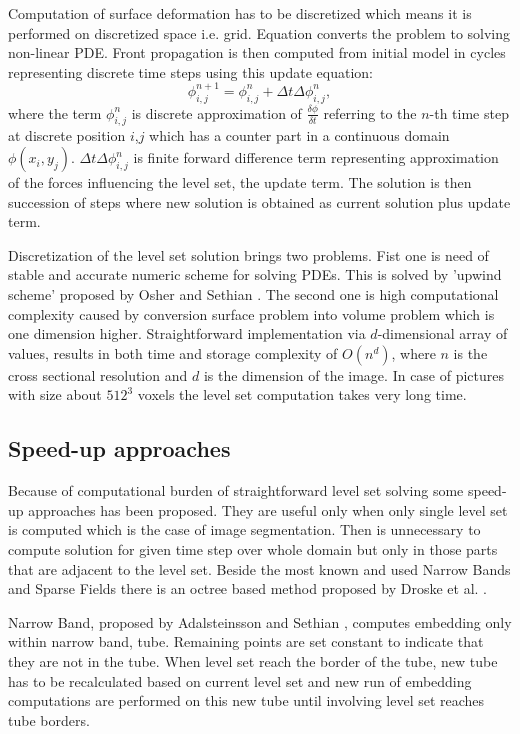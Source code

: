 Computation of surface deformation has to be discretized which means it is performed on discretized space i.e. grid.
Equation converts the problem to solving non-linear PDE.
Front propagation is then computed from initial model in cycles representing discrete time steps using this update equation:
\begin{equation}
\label{deformEqApprox}
\phi_{i,j}^{n+1} = \phi_{i,j}^{n} + \Delta t \Delta \phi_{i,j}^{n},
\end{equation}
where the term $\phi_{i,j}^{n}$ is discrete approximation of $\frac{\delta\phi}{\delta t}$ referring to the $n$-th time step at discrete position $i$,$j$ which has a counter part in a continuous domain $\phi(x_i, y_j)$.
$\Delta t \Delta \phi_{i,j}^{n}$ is finite forward difference term representing approximation of the forces influencing the level set, the update term.
The solution is then succession of steps where new solution is obtained as current solution plus update term.

\par
Discretization of the level set solution brings two problems.
Fist one is need of stable and accurate numeric scheme for solving PDEs.
This is solved by 'upwind scheme' proposed by Osher and Sethian \cite{sethianLS}.
The second one is high computational complexity caused by conversion surface problem into volume problem which is one dimension higher.
Straightforward implementation via $d$-dimensional array of values, results in both time and storage complexity of $O(n^d)$, where $n$ is the cross sectional resolution and $d$ is the dimension of the image.
In case of pictures with size about $512^3$ voxels the level set computation takes very long time.

\subsection{Speed-up approaches}

\par
Because of computational burden of straightforward level set solving some speed-up approaches has been proposed.
They are useful only when only single level set is computed which is the case of image segmentation.
Then is unnecessary to compute solution for given time step over whole domain but only in those parts that are adjacent to the level set.
Beside the most known and used Narrow Bands and Sparse Fields there is an octree based method proposed by Droske et al. \cite{octree}.

\par
Narrow Band, proposed by Adalsteinsson and Sethian \cite{sethianFastLS}, computes embedding only within narrow band, tube.
Remaining points are set constant to indicate that they are not in the tube.
When level set reach the border of the tube, new tube has to be recalculated based on current level set and new run of embedding computations are performed on this new tube until involving level set reaches tube borders.

